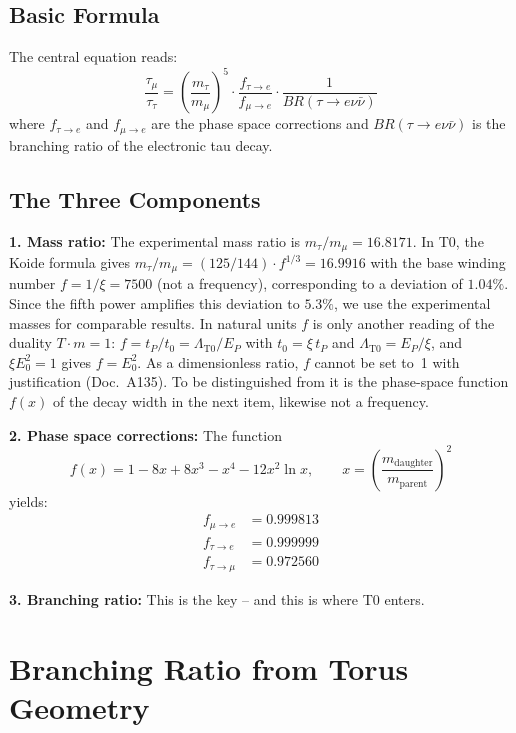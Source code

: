 	\subsection{Basic Formula}
	
	The central equation reads:
	\begin{equation}
		\frac{\tau_\mu}{\tau_\tau} = \left(\frac{m_\tau}{m_\mu}\right)^5 \cdot \frac{f_{\tau \to e}}{f_{\mu \to e}} \cdot \frac{1}{BR(\tau \to e \nu \bar\nu)}
		\label{eq:lifetime-ratio}
	\end{equation}
	where $f_{\tau \to e}$ and $f_{\mu \to e}$ are the phase space corrections and $BR(\tau \to e \nu \bar\nu)$ is the branching ratio of the electronic tau decay.
	
	\subsection{The Three Components}
	
	\textbf{1. Mass ratio:} The experimental mass ratio is $m_\tau/m_\mu = 16.8171$. In T0, the Koide formula gives $m_\tau/m_\mu = (125/144) \cdot f^{1/3} = 16.9916$ with the base winding number $f = 1/\xi = 7500$ (not a frequency), corresponding to a deviation of $1.04\%$. Since the fifth power amplifies this deviation to $5.3\%$, we use the experimental masses for comparable results.
	In natural units $f$ is only another reading of the duality $T\cdot m = 1$: $f = t_P/t_0 = \Lambda_{\text{T0}}/E_P$ with $t_0 = \xi\,t_P$ and $\Lambda_{\text{T0}} = E_P/\xi$, and $\xi E_0^2 = 1$ gives $f = E_0^2$. As a dimensionless ratio, $f$ cannot be set to~1 with justification (Doc.~A135). To be distinguished from it is the phase-space function $f(x)$ of the decay width in the next item, likewise not a frequency.

	\textbf{2. Phase space corrections:} The function
	\begin{equation}
		f(x) = 1 - 8x + 8x^3 - x^4 - 12 x^2 \ln x, \qquad x = \left(\frac{m_\text{daughter}}{m_\text{parent}}\right)^2
	\end{equation}
	yields:
	\begin{align}
		f_{\mu \to e} &= 0.999813 \\
		f_{\tau \to e} &= 0.999999 \\
		f_{\tau \to \mu} &= 0.972560
	\end{align}
	
	\textbf{3. Branching ratio:} This is the key -- and this is where T0 enters.
	
	
	\section{Branching Ratio from Torus Geometry}
	
